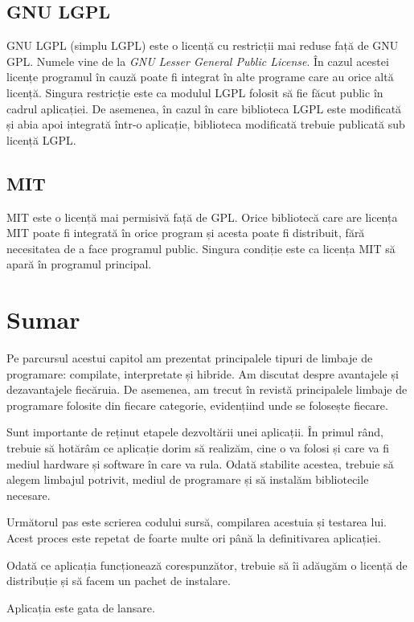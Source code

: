 \subsection{GNU LGPL}
\label{sec:appdev-licensing-lgpl}

GNU LGPL  (simplu LGPL) este
o licență cu restricții mai reduse față de GNU GPL. Numele vine de la \textit{GNU
Lesser General Public License}. În cazul acestei licențe programul în cauză poate
fi integrat în alte programe care au orice altă licență. Singura restricție este
ca modulul LGPL folosit să fie făcut public în cadrul aplicației. De asemenea,
în cazul în care biblioteca LGPL este modificată și abia apoi integrată într-o
aplicație, biblioteca modificată trebuie publicată sub licență LGPL.

\subsection{MIT}
\label{sec:appdev-licensing-mit}

MIT  este o licență mai
permisivă față de GPL. Orice bibliotecă care are licența MIT poate fi integrată
în orice program și acesta poate fi distribuit, fără necesitatea de a face
programul public. Singura condiție este ca licența MIT să apară în programul
principal.

\section{Sumar}
\label{sec:appdev-summary}

Pe parcursul acestui capitol am prezentat principalele tipuri de limbaje de
programare: compilate, interpretate și hibride. Am discutat despre avantajele și
dezavantajele fiecăruia. De asemenea, am trecut în revistă principalele limbaje
de programare folosite din fiecare categorie, evidențiind unde se folosește
fiecare.

Sunt importante de reținut etapele dezvoltării unei aplicații. În primul rând,
trebuie să hotărâm ce aplicație dorim să realizăm, cine o va folosi și care va
fi mediul hardware și software în care va rula. Odată stabilite acestea, trebuie
să alegem limbajul potrivit, mediul de programare și să instalăm bibliotecile
necesare.

Următorul pas este scrierea codului sursă, compilarea acestuia și testarea lui.
Acest proces este repetat de foarte multe ori până la definitivarea aplicației.

Odată ce aplicația funcționează corespunzător, trebuie să îi adăugăm o licență
de distribuție și să facem un pachet de instalare.

Aplicația este gata de lansare.
